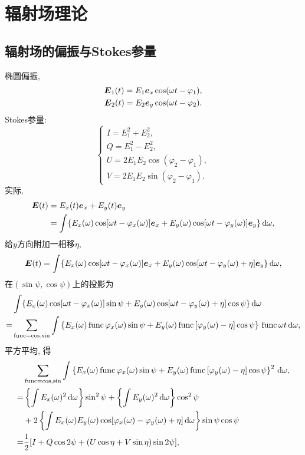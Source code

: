 \chapter{辐射场理论}

\section{辐射场的偏振与Stokes参量}

椭圆偏振,
\begin{align}
    \boldsymbol{E}_1(t)=E_1\boldsymbol{e}_x\cos(\omega t-\varphi_1),\\
    \boldsymbol{E}_2(t)=E_2\boldsymbol{e}_y\cos(\omega t-\varphi_2).
\end{align}
Stokes参量:
\begin{equation}
    \begin{cases}
        I=E_1^2+E_2^2,\\
        Q=E_1^2-E_2^2,\\
        U=2E_1E_2\cos(\varphi_2-\varphi_1),\\
        V=2E_1E_2\sin(\varphi_2-\varphi_1).
    \end{cases}
\end{equation}
实际,
\begin{align}
    \boldsymbol{E}(t)&=E_x(t)\boldsymbol{e}_x+E_y(t)\boldsymbol{e}_y\\
    &=\int \{E_x(\omega)\cos[\omega t-\varphi_x(\omega)]\boldsymbol{e}_x+E_y(\omega)\cos[\omega t-\varphi_y(\omega)]\boldsymbol{e}_y\}\,\mathrm{d}\omega,
\end{align}
给$y$方向附加一相移$\eta$,
\begin{equation}
    \boldsymbol{E}(t)=\int \{E_x(\omega)\cos[\omega t-\varphi_x(\omega)]\boldsymbol{e}_x+E_y(\omega)\cos[\omega t-\varphi_y(\omega)+\eta]\boldsymbol{e}_y\}\,\mathrm{d}\omega,
\end{equation}
在$(\sin\psi,\cos\psi)$上的投影为
\begin{align}
    &\int \{E_x(\omega)\cos[\omega t-\varphi_x(\omega)]\sin\psi+E_y(\omega)\cos[\omega t-\varphi_y(\omega)+\eta]\cos\psi\}\,\mathrm{d}\omega\\
    =&\sum_{\text{func}=\cos,\sin}\int \left\{E_x(\omega)\,\text{func}\,\varphi_x(\omega)\sin\psi+E_y(\omega)\,\text{func}\,[\varphi_y(\omega)-\eta]\cos\psi\right\}\,\text{func}\,\omega t\,\mathrm{d}\omega,
\end{align}
平方平均, 得
\begin{align}
    &\sum_{\text{func}=\cos,\sin}\int \left\{E_x(\omega)\,\text{func}\,\varphi_x(\omega)\sin\psi+E_y(\omega)\,\text{func}\,[\varphi_y(\omega)-\eta]\cos\psi\right\}^2\,\mathrm{d}\omega,\\
    =&\left\{\int E_x(\omega)^2\,\mathrm{d}\omega\right\}\sin^2\psi+\left\{\int E_y(\omega)^2\,\mathrm{d}\omega\right\}\cos^2\psi\nonumber\\
    &+2\left\{\int E_x(\omega)E_y(\omega)\cos[\varphi_x(\omega)-\varphi_y(\omega)+\eta]\,\mathrm{d}\omega\right\}\sin\psi\cos\psi\nonumber\\
    =&\frac{1}{2}[I+Q\cos2\psi+(U\cos\eta+V\sin\eta)\sin2\psi],
\end{align}
